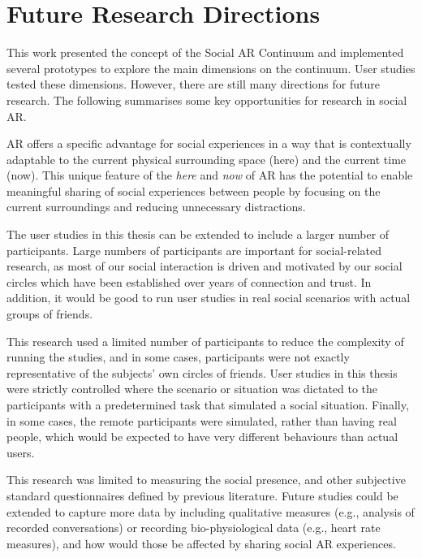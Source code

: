 

\pagebreak
\section{Future Research Directions}

This work presented the concept of the Social AR Continuum and implemented several prototypes to explore the main dimensions on the continuum. User studies tested these dimensions. However, there are still many directions for future research. The following summarises some key opportunities for research in social AR.

AR offers a specific advantage for social experiences in a way that is contextually adaptable to the current physical surrounding space (here) and the current time (now). This unique feature of the \textit{here} and \textit{now} of AR has the potential to enable meaningful sharing of social experiences between people by focusing on the current surroundings and reducing unnecessary distractions.

The user studies in this thesis can be extended to include a larger number of participants. Large numbers of participants are important for social-related research, as most of our social interaction is driven and motivated by our social circles which have been established over years of connection and trust.  In addition, it would be good to run user studies in real social scenarios with actual groups of friends.

This research used a limited number of participants to reduce the complexity of running the studies, and in some cases, participants were not exactly representative of the subjects' own circles of friends. User studies in this thesis were strictly controlled where the scenario or situation was dictated to the participants with a predetermined task that simulated a social situation. Finally, in some cases, the remote participants were simulated, rather than having real people, which would be expected to have very different behaviours than actual users.

This research was limited to measuring the social presence, and other subjective standard questionnaires defined by previous literature. Future studies could be extended to capture more data by including qualitative measures (e.g., analysis of recorded conversations) or recording bio-physiological data (e.g., heart rate measures), and how would those be affected by sharing social AR experiences.



